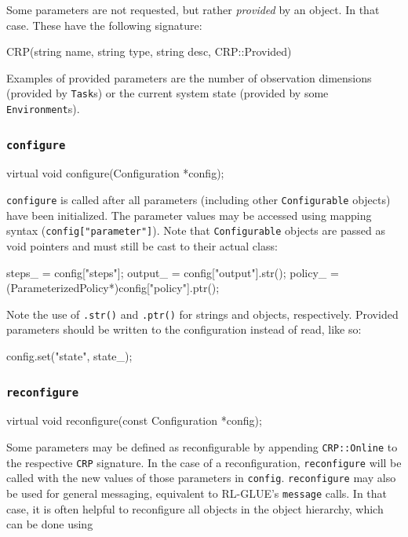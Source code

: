 \documentclass{article}
\newcommand{\txt}[1]{\texttt{#1}}
\newenvironment{code}{\alltt}{\endalltt}
\begin{document}
Some parameters are not requested, but rather \emph{provided} by an object. In
that case. These have the following signature:

\begin{code}
CRP(string name, string type, string desc, CRP::Provided)
\end{code}

Examples of provided parameters are the number of observation dimensions
(provided by \txt{Task}s) or the current system state (provided by some
\txt{Environment}s).

\subsubsection{\txt{configure}}

\begin{code}
virtual void configure(Configuration *config);
\end{code}

\txt{configure} is called after all parameters (including other
\txt{Configurable} objects) have been initialized. The parameter values may
be accessed using mapping syntax (\txt{config["parameter"]}). Note that
\txt{Configurable} objects are passed as void pointers and must still be cast to
their actual class:

\begin{code}
steps_ = config["steps"];  
output_ = config["output"].str();
policy_ = (ParameterizedPolicy*)config["policy"].ptr();
\end{code}

Note the use of \txt{.str()} and \txt{.ptr()} for strings and objects,
respectively. Provided parameters should be written to the configuration
instead of read, like so:

\begin{code}
config.set("state", state_);
\end{code}

\subsubsection{\txt{reconfigure}}
\begin{code}
virtual void reconfigure(const Configuration *config);
\end{code}

Some parameters may be defined as reconfigurable by appending
\txt{CRP::Online} to the respective \txt{CRP} signature. In the case of a
reconfiguration, \txt{reconfigure} will be called with the new values of
those parameters in \txt{config}. \txt{reconfigure} may also be used for
general messaging, equivalent to RL-GLUE's \txt{message} calls. In that
case, it is often helpful to reconfigure all objects in the object
hierarchy, which can be done using
\end{document}
